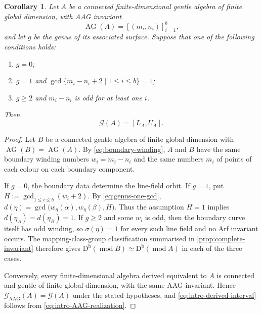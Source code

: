 \documentclass[11pt]{amsart}
\theoremstyle{definition}
\theoremstyle{plain}
\newtheorem{corollary}[corollary]{Corollary}
\theoremstyle{definition}
\theoremstyle{definition}
\newcommand{\Db}{\mathrm D^{\mathrm b}}
\newcommand{\modu}{\operatorname{mod}}
\newcommand{\AG}{\operatorname{AG}}
\newcommand{\GSpec}{\mathcal G}
\newcommand{\AGSpec}{\mathcal G_{\mathrm{AAG}}}
\begin{document}
\begin{corollary}
\label{thm:intro-derived-interval}
Let $A$ be a connected finite-dimensional gentle algebra of finite global
dimension, with AAG invariant
\[
 \AG(A)=[(m_i,n_i)]_{i=1}^b,
\] and let $g$ be the genus of its associated
surface. Suppose that one of the following conditions holds:
\begin{enumerate}[label=\textup{(\roman*)}]
\item $g=0$;
\item $g=1$ and $\gcd\{m_i-n_i+2\mid1\leq i\leq b\}=1$;
\item $g\geq2$ and $m_i-n_i$ is odd for at least one $i$.
\end{enumerate}
Then
\begin{equation}
\label{eq:intro-derived-interval}
 \GSpec(A)=[L_A,U_A].
\end{equation}
\end{corollary}

\begin{proof}
Let $B$ be a connected gentle algebra of finite global dimension with
$\AG(B)=\AG(A)$.  By \eqref{eq:boundary-winding}, $A$ and $B$ have the same
boundary winding numbers $w_i=m_i-n_i$ and the same numbers $m_i$ of
points of each colour on each boundary component.

If $g=0$, the boundary data determine the line-field orbit. If $g=1$, put $H:=\gcd_{1\leq i\leq b}(w_i+2)$.
By \eqref{eq:genus-one-gcd},
$d(\eta)=
 \gcd\bigl(w_\eta(\alpha),w_\eta(\beta),H\bigr).$
Thus the assumption $H=1$ implies
$d(\eta_A)=d(\eta_B)=1$. If $g\geq2$ and
some $w_i$ is odd, then the boundary curve itself has odd winding, so
$\sigma(\eta)=1$ for every such line field and no Arf invariant occurs.  The
mapping-class-group classification summarised in
\cref{prop:complete-invariant} therefore gives
$\Db(\modu B)\simeq\Db(\modu A)$ in each of the three cases.

Conversely, every finite-dimensional algebra derived equivalent
to $A$ is connected and gentle of finite global dimension,
with the same AAG invariant. Hence
$\AGSpec(A)=\GSpec(A)$ under the stated hypotheses, and
\eqref{eq:intro-derived-interval} follows from
\eqref{eq:intro-AAG-realization}.
\end{proof}
\end{document}
